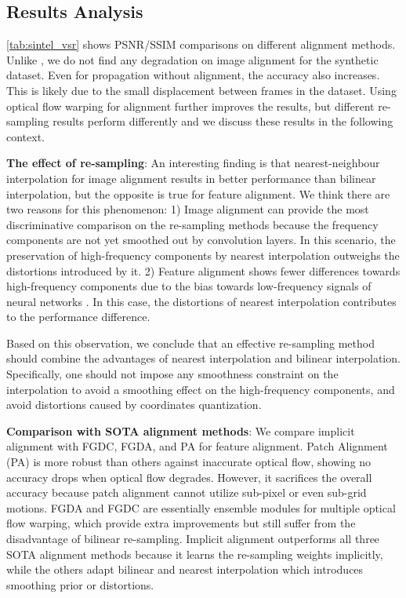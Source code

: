 \documentclass[10pt,twocolumn,letterpaper]{article}
\begin{document}
\subsection{Results Analysis} 
\cref{tab:sintel_vsr} shows PSNR/SSIM comparisons on different alignment methods. Unlike \cite{chan2021basicvsr, shi2022rethinking}, we do not find any degradation on image alignment for the synthetic dataset. Even for propagation without alignment, the accuracy also increases. This is likely due to the small displacement between frames in the dataset. Using optical flow warping for alignment further improves  the results, but different re-sampling results perform differently and we discuss these results in the following context.


\noindent\textbf{The effect of re-sampling}:
An interesting finding is that nearest-neighbour interpolation for image alignment results in better performance than bilinear interpolation, but the opposite is true for feature alignment. We think there are two reasons for this phenomenon: 1) Image alignment can provide the most discriminative comparison on the re-sampling methods because the frequency components are not yet smoothed out by convolution layers. In this scenario, the preservation of high-frequency components by nearest interpolation outweighs the distortions introduced by it. 2) Feature alignment shows fewer differences towards high-frequency components due to the bias towards
low-frequency signals of neural networks \cite{rahaman2019spectral, chen2021ssd}. In this case,  the distortions of nearest interpolation contributes to the performance difference.

Based on this observation, we conclude that an effective re-sampling method should combine the advantages of nearest interpolation and bilinear interpolation. Specifically, one should not impose any smoothness constraint on the interpolation to avoid a smoothing effect on the high-frequency components, and avoid distortions caused by coordinates quantization. 


\noindent\textbf{Comparison with SOTA alignment methods}: We compare implicit alignment with FGDC, FGDA, and PA for feature alignment. Patch Alignment (PA) is more robust than others against inaccurate optical flow, showing no accuracy drops when optical flow degrades. However, it sacrifices the overall accuracy because patch alignment cannot utilize sub-pixel or even sub-grid motions. FGDA and FGDC are essentially ensemble modules for multiple optical flow warping, which provide extra improvements but still suffer from the disadvantage of bilinear re-sampling. Implicit alignment outperforms all three SOTA alignment methods because it learns the re-sampling weights implicitly, while the others adapt bilinear and nearest interpolation which introduces smoothing prior or distortions.
\end{document}
